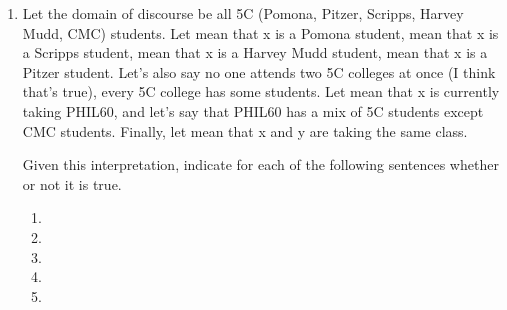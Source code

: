 \begin{enumerate}
\begin{enumerate}

   \end{enumerate}

\newpage

  \item Let the domain of discourse be all 5C (Pomona, Pitzer, Scripps, Harvey 
   Mudd, CMC) students.  Let  mean that x is a Pomona student,  mean 
   that x is a Scripps student,  mean that x is a Harvey Mudd student, 
    mean that x is a Pitzer student.  Let's also say no one attends two 5C 
   colleges at once (I think that's true),  every 5C college has some students.  
   Let  mean that x is currently taking PHIL60, and let's say that PHIL60 
   has a mix of 5C students except CMC students.  Finally,
	let  mean that x and y are taking the same class. 

   Given this interpretation, indicate for each of the following sentences 
   whether or not it is true.

   \begin{enumerate}

   \setlength{\itemsep}{1em}


   \item {}

	\ansT


   \item {}

	\ansF




   \item {}

	 \ansF


	\item {}

	 \ansT


	\item {}

	 \ansF



\end{enumerate}
\end{enumerate}
